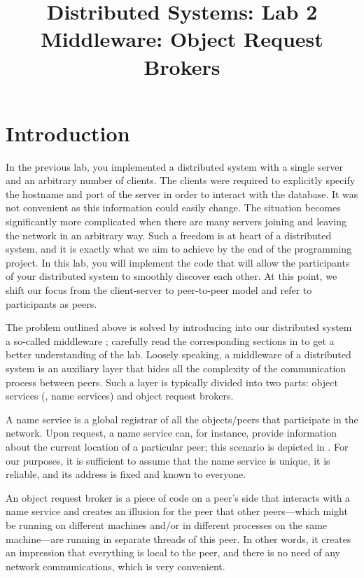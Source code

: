 \documentclass[a4paper]{article}
\title{%
  Distributed Systems: Lab 2\\%
  Middleware: Object Request Brokers%
}
\author{}
\date{}
\begin{document}
\maketitle

\section{Introduction}

In the previous lab, you implemented a distributed system with a single server
and an arbitrary number of clients. The clients were required to explicitly
specify the hostname and port of the server in order to interact with the
database. It was not convenient as this information could easily change. The
situation becomes significantly more complicated when there are many servers
joining and leaving the network in an arbitrary way. Such a freedom is at heart
of a distributed system, and it is exactly what we aim to achieve by the end of
the programming project. In this lab, you will implement the code that will
allow the participants of your distributed system to smoothly discover each
other. At this point, we shift our focus from the client-server to peer-to-peer
model \cite{lecture3} and refer to participants as peers.

The problem outlined above is solved by introducing into our distributed system
a so-called middleware \cite{lecture4}; carefully read the corresponding
sections in \cite{lecture4} to get a better understanding of the lab. Loosely
speaking, a middleware of a distributed system is an auxiliary layer that hides
all the complexity of the communication process between peers. Such a layer is
typically divided into two parts: object services (\eg, name services) and
object request brokers.

A name service is a global registrar of all the objects/peers that participate
in the network. Upon request, a name service can, for instance, provide
information about the current location of a particular peer; this scenario is
depicted in . For our purposes, it is sufficient to assume
that the name service is unique, it is reliable, and its address is fixed and
known to everyone.

An object request broker \cite{lecture4, orb} is a piece of code on a peer's
side that interacts with a name service and creates an illusion for the peer
that other peers---which might be running on different machines and/or in
different processes on the same machine---are running in separate threads of
this peer. In other words, it creates an impression that everything is local to
the peer, and there is no need of any network communications, which is very
convenient.
\end{document}
